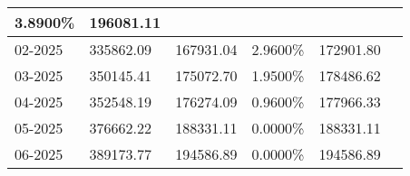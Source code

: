 \documentclass{report}
\begin{document}
\begin{longtable}[c]{|p{1.7cm}|p{2.6cm}|p{2.6cm}|p{2.3cm}|p{2.3cm}|c|}
3.8900\% & 196081.11\\ \hline02-2025 & 335862.09 & 167931.04 & 2.9600\% & 172901.80\\ \hline03-2025 & 350145.41 & 175072.70 & 1.9500\% & 178486.62\\ \hline04-2025 & 352548.19 & 176274.09 & 0.9600\% & 177966.33\\ \hline05-2025 & 376662.22 & 188331.11 & 0.0000\% & 188331.11\\ \hline06-2025 & 389173.77 & 194586.89 & 0.0000\% & 194586.89\\ \hline
\end{longtable}
\end{document}
